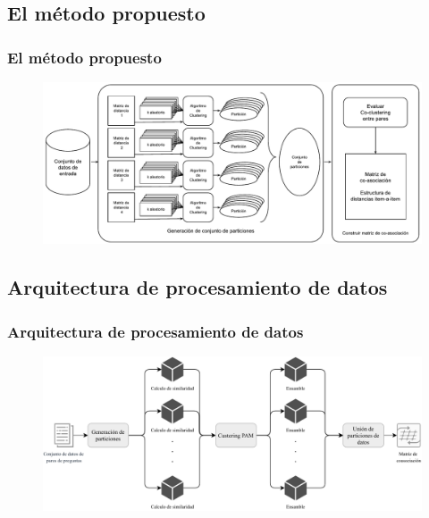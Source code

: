 \subsection{El método propuesto}
\begin{frame}
	\frametitle{El método propuesto}
	\begin{figure}
		\centering
		\includegraphics[width=0.9\linewidth]{../8_problema_investigacion/imagenes/metodo_equal}
		\label{fig:metodoequal}
	\end{figure}
\end{frame}

\subsection{Arquitectura de procesamiento de datos}
\begin{frame}
	\frametitle{Arquitectura de procesamiento de datos}
	\begin{figure}
		\centering
		\includegraphics[width=0.9\linewidth]{../8_problema_investigacion/imagenes/equal_distribuido}
		\label{fig:equaldistribuido}
	\end{figure}
\end{frame}

